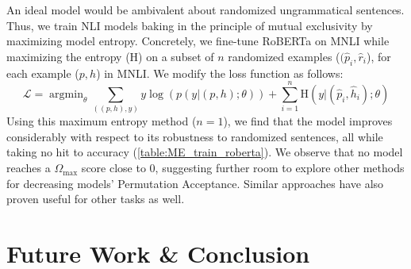 \documentclass[11pt,a4paper]{article}
\newcommand{\PermAcc}{Permutation Acceptance} %
\DeclareMathOperator*{\argminB}{argmin}
\begin{document}

An ideal model would be ambivalent about randomized ungrammatical sentences. Thus, we train NLI models baking in the principle of mutual exclusivity \citep{gandhi2019mutual} by maximizing model entropy. Concretely, we fine-tune RoBERTa on MNLI while maximizing the entropy ($\bm{\mathrm{H}}$) on a subset of $n$ randomized examples ($(\hat{p}_i, \hat{r}_i$), for each example ($p,h$) in MNLI. We modify the loss function as follows:
\begin{dmath}
    \mathcal{L}=\argminB_{\theta}\sum_{\left((p, h),y\right)}y\log(p(y|(p,h);\theta)) + \sum_{i=1}^n \bm{\mathrm{H}}\left(y|(\hat{p}_i,\hat{h}_i);\theta\right)
\end{dmath}
Using this maximum entropy method ($n=1$), we find that the model improves considerably with respect to its robustness to randomized sentences, all while taking no hit to accuracy (\autoref{table:ME_train_roberta}). We observe that no model reaches a $\Omega_{\text{max}}$ score close to 0, suggesting further room to explore other methods for decreasing models' \PermAcc. Similar approaches have also proven useful \citep{gupta-etal-2021-bert} for other tasks as well.




\section{Future Work \& Conclusion}
\end{document}
